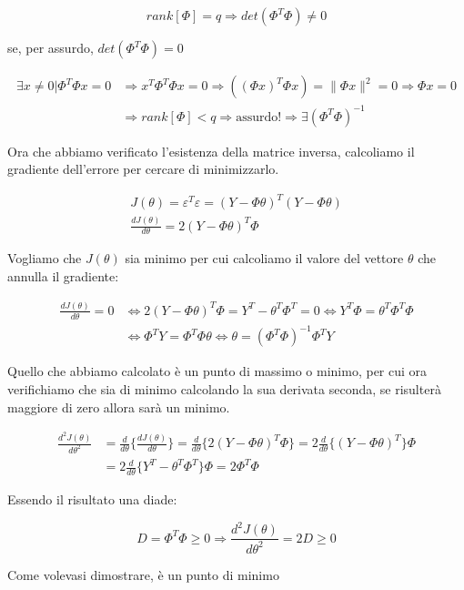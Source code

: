 \begin{dimostrazione}

  \[ rank[\Phi]=q \Longrightarrow det(\Phi^T\Phi) \ne 0 \]
  
se, per assurdo, $det(\Phi^T\Phi)=0$

  \[ 
    \begin{split}
      \exists x \ne 0 | \Phi^T\Phi x=0 &\Longrightarrow x^T\Phi^T\Phi x=0 \Longrightarrow ((\Phi x)^T\Phi x)=\| \Phi x \|^2 =0 \Longrightarrow \Phi x =0\\
       &\Longrightarrow rank[\Phi]<q \Longrightarrow \text{assurdo!} \Longrightarrow \exists (\Phi^T\Phi)^{-1} 
    \end{split} 
  \]
  
Ora che abbiamo verificato l'esistenza della matrice inversa, calcoliamo il gradiente dell'errore per cercare di minimizzarlo.

  \begin{gather*}
    J(\theta)=\varepsilon^T\varepsilon=(Y-\Phi\theta)^T(Y-\Phi\theta)\\
    \frac{dJ(\theta)}{d\theta}=2(Y-\Phi\theta)^T\Phi
  \end{gather*}
  
Vogliamo che $J(\theta)$ sia minimo per cui calcoliamo il valore del vettore $\theta$ che annulla il gradiente:

  \[ 
    \begin{split}\frac{dJ(\theta)}{d\theta} = 0 &\Leftrightarrow  2(Y-\Phi\theta)^T\Phi=Y^T-\theta^T\Phi^T=0 \Leftrightarrow Y^T\Phi=\theta^T\Phi^T\Phi \\ &\Leftrightarrow \Phi^TY=\Phi^T\Phi\theta \Leftrightarrow \theta= (\Phi^T\Phi)^{-1}\Phi^TY 
    \end{split}
  \]
  
Quello che abbiamo calcolato è un punto di massimo o minimo, per cui ora verifichiamo che sia di minimo calcolando la sua derivata seconda, se risulterà maggiore di zero allora sarà un minimo.

  \[ 
    \begin{split} \frac{d^2J(\theta)}{d\theta^2}&=\frac{d}{d\theta}\{\frac{dJ(\theta)}{d\theta}\}= \frac{d}{d\theta}\{2(Y-\Phi\theta)^T\Phi\}=2\frac{d}{d\theta}\{(Y-\Phi\theta)^T\}\Phi\\
  &=2\frac{d}{d\theta}\{Y^T-\theta^T\Phi^T\}\Phi=2\Phi^T\Phi 
    \end{split} 
  \] 

Essendo il risultato una diade:

  \[ D=\Phi^T\Phi \geq 0 \Longrightarrow \frac{d^2J(\theta)}{d\theta^2}=2D \geq 0 \]
  
Come volevasi dimostrare, è un punto di minimo
\end{dimostrazione}

